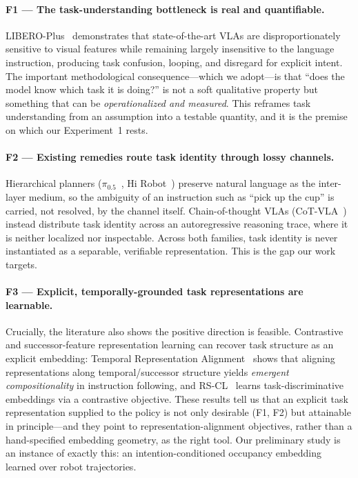 \paragraph{F1 --- The task-understanding bottleneck is real and quantifiable.}
LIBERO-Plus~\cite{liberoplus} demonstrates that state-of-the-art VLAs are
disproportionately sensitive to visual features while remaining largely
insensitive to the language instruction, producing task confusion, looping, and
disregard for explicit intent. The important methodological consequence---which
we adopt---is that ``does the model know which task it is doing?'' is not a soft
qualitative property but something that can be \emph{operationalized and
measured}. This reframes task understanding from an assumption into a testable
quantity, and it is the premise on which our Experiment~1 rests.

\paragraph{F2 --- Existing remedies route task identity through lossy channels.}
Hierarchical planners ($\pi_{0.5}$~\cite{pi05}, Hi Robot~\cite{hirobot}) preserve
natural language as the inter-layer medium, so the ambiguity of an instruction
such as ``pick up the cup'' is carried, not resolved, by the channel itself.
Chain-of-thought VLAs (CoT-VLA~\cite{cotvla}) instead distribute task identity
across an autoregressive reasoning trace, where it is neither localized nor
inspectable. Across both families, task identity is never instantiated as a
separable, verifiable representation. This is the gap our work targets.

\paragraph{F3 --- Explicit, temporally-grounded task representations are
learnable.} Crucially, the literature also shows the positive direction is
feasible. Contrastive and successor-feature representation learning can recover
task structure as an explicit embedding: Temporal Representation
Alignment~\cite{tra} shows that aligning representations along temporal/successor
structure yields \emph{emergent compositionality} in instruction following, and
RS-CL~\cite{rscl} learns task-discriminative embeddings via a contrastive
objective. These results tell us that an explicit task representation supplied to
the policy is not only desirable (F1, F2) but attainable in principle---and they
point to representation-alignment objectives, rather than a hand-specified
embedding geometry, as the right tool. Our preliminary study is an instance of
exactly this: an intention-conditioned occupancy embedding learned over robot
trajectories.

